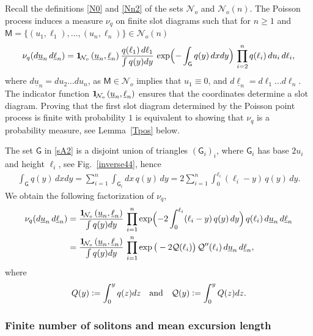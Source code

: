 \documentclass[12pt]{article}
\numberwithin{equation}{section}
\newcommand{\cN}{\mathcal N}
\newcommand{\sG}{\mathsf{G}}
\newcommand{\sM}{\mathsf{M}}
\newcommand{\uell}{\underline \ell}
\newcommand{\uu}{\underline u}
\newcommand{\one}{{\bf 1}\hskip-.5mm} %
\begin{document}
Recall the definitions \eqref{N0} and \eqref{Nn2} of the sets $\mathcal N_o$ and $\mathcal N_o(n)$. 
The Poisson process induces a measure $\nu_q$ on finite slot diagrams  
such that for $n\ge 1$ and $\sM = \{(u_1, \ell_1), \dots, (u_n, \ell_n)\} \in \mathcal N_o(n)$ 
\begin{align}
	\label{nuq4}
	\nu_q(d\uu_n\, d\uell_n) = \one_{\mathcal N_o}\left(\underline u_n, \underline \ell_n\right)\frac{q(\ell_1)\, d\ell_1}{\int q(y)dy}\, \exp\Bigl(-\int_{\sG} q(y)\, dxdy\Bigr)\, \prod_{i=2}^n q(\ell_i)\, du_i\, d\ell_i, 
\end{align}
where $d\uu_n=du_2\dots du_n$, as $\sM\in\cN_o$ implies that $u_1\equiv 0$, and $d\uell_n=d\ell_1\dots d\ell_n$. The indicator function $\one_{\mathcal N_o}\left(\underline u_n, \underline \ell_n\right)$  ensures that the coordinates determine a slot diagram. Proving that the first slot diagram determined by the Poisson point process is finite with probability $1$ is equivalent to showing that $\nu_q$ is a probability measure, see Lemma~\ref{Tpos} below.




The set $\sG$ in \eqref{sA2} is a disjoint union of triangles $(\sG_i)_i$, where $\sG_i$ has base $2 u_i$ and height $\ell_i$, see Fig.~\ref{inverse44}, hence
\begin{align}
	\label{gii7}
	\int_\sG q(y)\, dxdy = \sum_{i=1}^n \int_{\sG_i}dx\, q(y)\, dy=2\sum_{i=1}^n \int_0^{\ell_i} (\ell_i-y)\, q(y)\, dy.
\end{align}
We obtain the following factorization of $\nu_q$,
\begin{align}
	\label{nuq5}
	\nu_q(d\uu_n\, d\uell_n) &= \frac{\one_{\mathcal N_o}\left(\underline u_n, \underline \ell_n\right)}{\int q(y)dy}\, \prod_{i=1}^n \exp\Bigl(-2\int_0^{\ell_i} (\ell_i-y)\, q(y)\, dy\Bigr)\, q(\ell_i)\, d\uu_n\, d\uell_n \notag\\
	&= \frac{\one_{\mathcal N_o}\left(\underline u_n, \underline \ell_n\right)}{\int q(y)dy}\, \prod_{i=1}^n \exp\big(-2\mathcal Q(\ell_i)\big)\, \mathcal Q''(\ell_i)\, d\uu_n\, d\uell_n ,
\end{align}
where 
\begin{align}
	\label{qm7}
	Q(y)\vcentcolon =\int_0^yq(z)dz \quad \text{and} \quad \mathcal Q(y)\vcentcolon =\int_0^yQ(z)dz.
\end{align}



\subsubsection{Finite number of solitons and mean excursion length}\label{aux}
\end{document}
